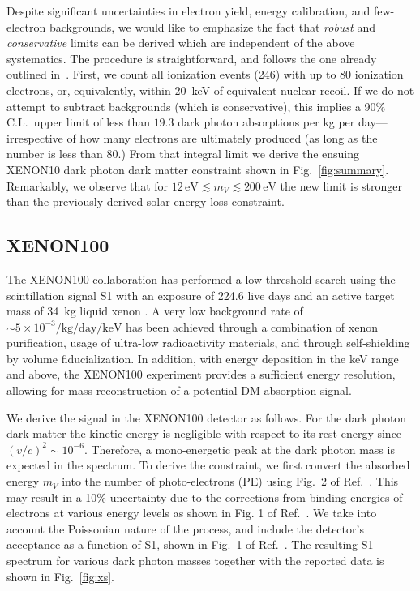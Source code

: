 \documentclass[prd,reprint,nofootinbib,notitlepage,aps,tightenlines,preprintnumbers,amsmath,amssymb,showpacs,superscriptaddress]{revtex4-1}
\newcommand{\kg}{\ensuremath{\mathrm{kg}}}
\newcommand{\eV}{\ensuremath{\mathrm{eV}}}
\newcommand{\keV}{\ensuremath{\mathrm{keV}}}
\renewcommand{\day}{\ensuremath {\mathrm{day}}}
\begin{document}
Despite significant uncertainties in electron yield, energy
calibration, and few-electron backgrounds, we would like to emphasize the
fact that \textit{robust} and \textit{conservative} limits can be derived which are 
independent of the above systematics. The procedure is straightforward, and 
follows the one already outlined in~\cite{An:2013yua}.
%
First, we count all ionization events (246) with up to 80 ionization
electrons, or, equivalently, within 20~keV of equivalent nuclear
recoil.  If we do not attempt to subtract backgrounds (which is conservative), this
implies a $90\%$ C.L.~upper limit of less than $19.3$ dark photon
absorptions per kg per day---irrespective of how many electrons are
ultimately produced (as long as the number is less than 80.)  From
that integral limit we derive the ensuing XENON10 dark photon dark
matter constraint shown in Fig.~\ref{fig:summary}. Remarkably, we
observe that for $ 12\,\eV \lesssim m_V\lesssim 200\,\eV $ the new
limit is stronger than the previously derived solar energy loss
constraint.

 

\subsection{XENON100}
\label{sec:xenon100}



The XENON100 collaboration has performed a low-threshold search using
the scintillation signal S1 with an exposure of 224.6 live days and an
active target mass of 34~kg liquid xenon \cite{Aprile:2014eoa}. A very low background rate
of $\sim 5\times 10^{-3}/\kg/\day/\keV $ has been achieved through
a combination of xenon purification, usage of ultra-low radioactivity
materials, and through self-shielding by volume fiducialization.
In addition, with energy deposition in the keV range and above, the XENON100 
experiment provides a sufficient energy resolution, allowing for 
mass reconstruction of a potential DM absorption signal. 

We derive the signal in the XENON100 detector as follows. For the dark
photon dark matter the kinetic energy is negligible with respect to
its rest energy since $(v/c)^2 \sim 10^{-6}$. Therefore, a
mono-energetic peak at the dark photon mass is expected in the
spectrum. To derive the constraint, we first convert the absorbed
energy $m_V$ into the number of photo-electrons (PE) using Fig.~2 of
Ref.~\cite{Aprile:2014eoa}. This may result in a 10\% uncertainty due
to the corrections from binding energies of electrons at various
energy levels as shown in Fig. 1 of Ref.~\cite{Szydagis:2013sih}. We
take into account the Poissonian nature of the process, and include
the detector's acceptance as a function of S1, shown in Fig.~1 of
Ref.~\cite{Aprile:2014eoa}. The resulting S1 spectrum for various dark
photon masses together with the reported data is shown in
Fig.~\ref{fig:xs}.
\end{document}
